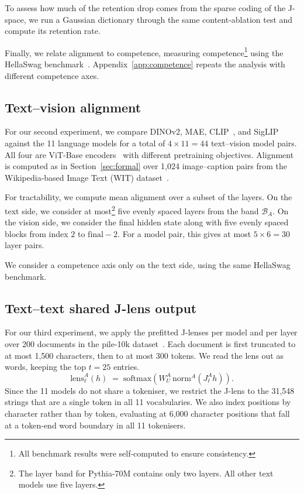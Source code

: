 \documentclass{article}
\begin{document}
To assess how much of the retention drop comes from the sparse coding of the J-space, we run a Gaussian dictionary through the same content-ablation test and compute its retention rate. 

Finally, we relate alignment to competence, measuring competence\footnote{All benchmark results were self-computed to ensure consistency.} using the HellaSwag benchmark~\citep{zellers2019hellaswagmachinereallyfinish}. Appendix~\ref{app:competence} repeats the analysis with different competence axes.

\subsection{Text--vision alignment}
For our second experiment, we compare DINOv2, MAE, CLIP~\citep{radford2021learningtransferablevisualmodels}, and SigLIP~\citep{zhai2023sigmoidlosslanguageimage} against the 11 language models for a total of $4 \times 11 = 44$ text--vision model pairs. All four are ViT-Base encoders~\citep{dosovitskiy2021imageworth16x16words} with different pretraining objectives. Alignment is computed as in Section~\ref{sec:formal} over 1,024 image--caption pairs from the Wikipedia-based Image Text (WIT) dataset~\citep{wit}. 

For tractability, we compute mean alignment over a subset of the layers. On the text side, we consider at most\footnote{The layer band for Pythia-70M contains only two layers. All other text models use five layers.} five evenly spaced layers from the band $\mathcal{B}_A$. On the vision side, we consider the final hidden state along with five evenly spaced blocks from index $2$ to $\mathrm{final}-2$. For a model pair, this gives at most $5 \times 6 = 30$ layer pairs.

We consider a competence axis only on the text side, using the same HellaSwag benchmark.

\subsection{Text--text shared J-lens output}
For our third experiment, we apply the prefitted J-lenses per model and per layer over 200 documents in the
pile-10k dataset~\citep{Nanda2022Pile10K}. Each document is first truncated to at most 1,500 characters, then to at most 300 tokens. We read the lens out as words, keeping the top $t=25$ entries.
\[
  \mathrm{lens}^A_\ell(h) \;=\; \mathrm{softmax}\!\left(W_U^A\,
  \mathrm{norm}^A\!\left(J^A_\ell h\right)\right).
\]
Since the 11 models do not share a tokeniser, we restrict the J-lens to the 31,548 strings that are a single token in all 11 vocabularies. We also index positions by character rather than by token, evaluating at 6,000 character positions that fall at a token-end word boundary in all 11 tokenisers.
\end{document}
